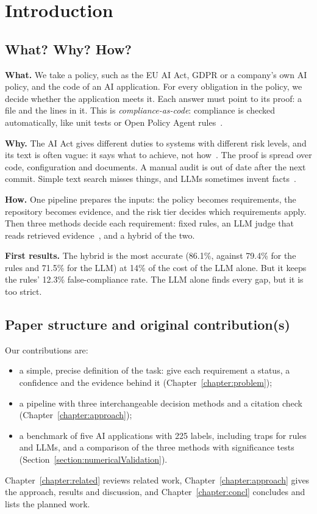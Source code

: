 \chapter{Introduction}
\label{chapter:introduction}

\section{What? Why? How?}
\label{section:what}

\textbf{What.} We take a policy, such as the EU AI Act, GDPR or a company's own AI policy, and the code of an AI
application. For every obligation in the policy, we decide whether the application meets it. Each answer must point to
its proof: a file and the lines in it. This is \emph{compliance-as-code}: compliance is checked automatically, like unit
tests or Open Policy Agent rules~\cite{opa}.

\textbf{Why.} The AI Act gives different duties to systems with different risk levels, and its text is often vague: it
says what to achieve, not how~\cite{veale2021demystifying}. The proof is spread over code, configuration and documents.
A manual audit is out of date after the next commit. Simple text search misses things, and LLMs sometimes invent
facts~\cite{ji2023survey}.

\textbf{How.} One pipeline prepares the inputs: the policy becomes requirements, the repository becomes evidence, and
the risk tier decides which requirements apply. Then three methods decide each requirement: fixed rules, an LLM judge
that reads retrieved evidence~\cite{lewis2020rag}, and a hybrid of the two.

\textbf{First results.} The hybrid is the most accurate (86.1\%, against 79.4\% for the rules and 71.5\% for the LLM)
at 14\% of the cost of the LLM alone. But it keeps the rules' 12.3\% false-compliance rate. The LLM alone finds every
gap, but it is too strict.

\section{Paper structure and original contribution(s)}
\label{section:structure}

Our contributions are:
\begin{itemize}[leftmargin=*]
  \item a simple, precise definition of the task: give each requirement a status, a confidence and the evidence behind
        it (Chapter~\ref{chapter:problem});
  \item a pipeline with three interchangeable decision methods and a citation check (Chapter~\ref{chapter:approach});
  \item a benchmark of five AI applications with 225 labels, including traps for rules and LLMs, and a comparison of
        the three methods with significance tests (Section~\ref{section:numericalValidation}).
\end{itemize}
Chapter~\ref{chapter:related} reviews related work, Chapter~\ref{chapter:approach} gives the approach, results and
discussion, and Chapter~\ref{chapter:concl} concludes and lists the planned work.
